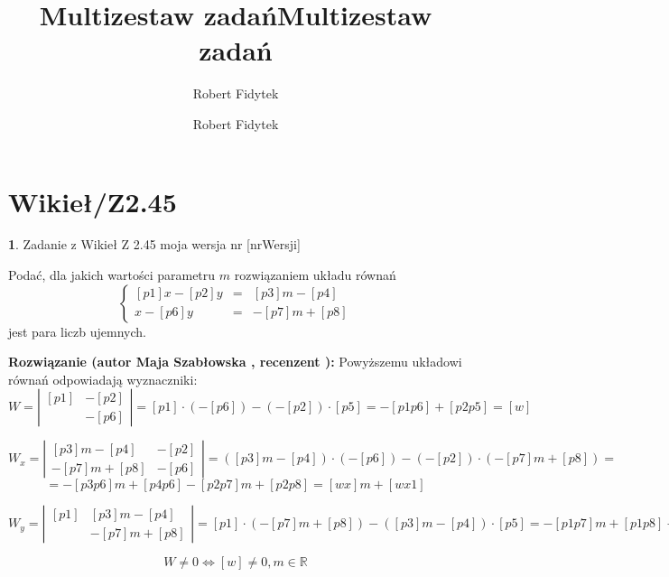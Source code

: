 \documentclass[12pt, a4paper]{article}
\title{Multizestaw zadań}
\author{Robert Fidytek}
\date{}\documentclass[12pt, a4paper]{article}
\title{Multizestaw zadań}
\author{Robert Fidytek}
\date{}
\theoremstyle{definition} %
\newtheorem{zad}{}
\theoremstyle{definition} %
\newtheorem{zad}{}
\newcommand{\kategoria}[1]{\section{#1}} %
\newcommand{\zadStart}[1]{\begin{zad}#1\newline} %
\newcommand{\zadStop}{\end{zad}}   %
\newcommand{\rozwStart}[2]{\noindent \textbf{Rozwiązanie (autor #1 , recenzent #2): }\newline} %
\begin{document}
\maketitle


\kategoria{Wikieł/Z2.45}
\zadStart{Zadanie z Wikieł Z 2.45  moja wersja nr [nrWersji]}

Podać, dla jakich wartości parametru $m$ rozwiązaniem układu równań
$$\left\{\begin{array}{ccc}
[p1]x-[p2]y&=&[p3]m-[p4]\\
[p5]x-[p6]y&=&-[p7]m+[p8]
\end{array} \right.$$
jest para liczb ujemnych. 
\zadStop

\rozwStart{Maja Szabłowska}{}
Powyższemu układowi równań odpowiadają wyznaczniki:
$$W=\left| \begin{array}{lccr} [p1] & -[p2] \\ [p5] & -[p6] \end{array}\right| = [p1]\cdot(-[p6]) - (-[p2])\cdot[p5]=-[p1p6]+[p2p5]=[w]$$

$$W_{x}=\left| \begin{array}{lccr} [p3]m -[p4] & -[p2] \\ -[p7]m+[p8] & -[p6] \end{array}\right| = ([p3]m-[p4])\cdot(-[p6]) - (- [p2])\cdot(-[p7]m+[p8])=$$
$$=-[p3p6]m+[p4p6]-[p2p7]m+[p2p8]=[wx]m+[wx1]$$

$$W_{y}=\left| \begin{array}{lccr} [p1] & [p3]m-[p4] \\ [p5] & -[p7]m+[p8] \end{array}\right| = [p1]\cdot(-[p7]m+[p8]) - ([p3]m-[p4])\cdot[p5]=-[p1p7]m+[p1p8]-[p3p5]m+[p4p5]=[wy]m+[wy1]$$

$$W\neq 0 \iff [w] \neq 0, m\in\mathbb{R} $$
\end{document}
